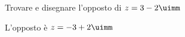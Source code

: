 	Trovare e disegnare l'opposto di $z=3-2\uimm$
	
	L'opposto è $z=-3+2\uimm$
	\begin{center}
		
		\label{fig:disegnopianocomplesso04}
	\end{center}
